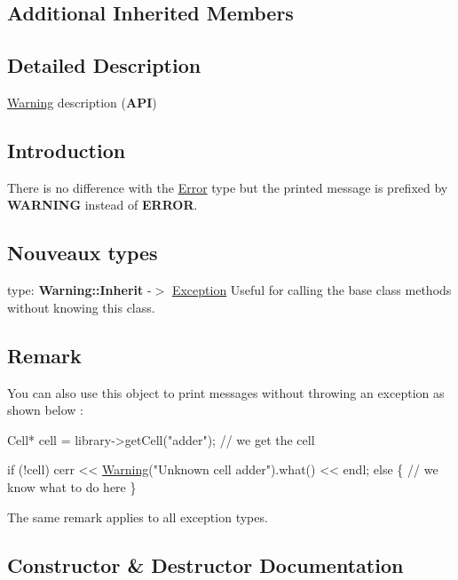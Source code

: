 \subsection*{Additional Inherited Members}


\subsection{Detailed Description}
\mbox{\hyperlink{classHurricane_1_1Warning}{Warning}} description ({\bfseries A\+PI}) 

\hypertarget{classHurricane_1_1Warning_secWarningIntro}{}\subsection{Introduction}\label{classHurricane_1_1Warning_secWarningIntro}
There is no difference with the \mbox{\hyperlink{classHurricane_1_1Error}{Error}} type but the printed message is prefixed by {\bfseries W\+A\+R\+N\+I\+NG} instead of {\bfseries E\+R\+R\+OR}.\hypertarget{classHurricane_1_1Warning_secWarningNouveauxTypes}{}\subsection{Nouveaux types}\label{classHurricane_1_1Warning_secWarningNouveauxTypes}
type\+: {\bfseries Warning\+::\+Inherit} -\/$>$ \mbox{\hyperlink{classHurricane_1_1Exception}{Exception}} Useful for calling the base class methods without knowing this class.\hypertarget{classHurricane_1_1Warning_secWarningRemark}{}\subsection{Remark}\label{classHurricane_1_1Warning_secWarningRemark}
You can also use this object to print messages without throwing an exception as shown below \+: 
\begin{DoxyCode}
Cell* cell = library->getCell(\textcolor{stringliteral}{"adder"}); \textcolor{comment}{// we get the cell}
 
\textcolor{keywordflow}{if} (!cell)
   cerr << \mbox{\hyperlink{classHurricane_1_1Warning_aea7aa9bccac13e6c15b1eb3b4741ef0d}{Warning}}(\textcolor{stringliteral}{"Unknown cell adder"}).what() << endl;
\textcolor{keywordflow}{else} \{
   \textcolor{comment}{// we know what to do here}
\}
\end{DoxyCode}
 The same remark applies to all exception types. 

\subsection{Constructor \& Destructor Documentation}
\mbox{\label{classHurricane_1_1Warning_aea7aa9bccac13e6c15b1eb3b4741ef0d}} 
